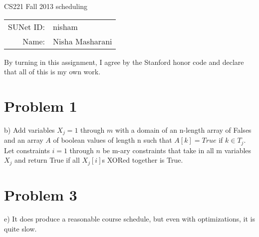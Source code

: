 \documentclass[12pt]{article}
\begin{document}
\begin{center}
{\Large CS221 Fall 2013 scheduling}

\begin{tabular}{rl}
SUNet ID: & nisham \\
Name: & Nisha Masharani \\
\end{tabular}
\end{center}

By turning in this assignment, I agree by the Stanford honor code and declare
that all of this is my own work.

\section*{Problem 1}

b) Add variables $X_j = 1$ through $m$ with a domain of an n-length array of Falses and an array $A$ of boolean values of length n such that $A[k] = True$ if $k \in T_j$. 
Let constraints $i = 1$ through $n$ be m-ary constraints that take in all m variables $X_j$ and return True if all $X_j[i]$s XORed together is True.

\section*{Problem 3}

e) It does produce a reasonable course schedule, but even with optimizations, it is quite slow.
\end{document}
